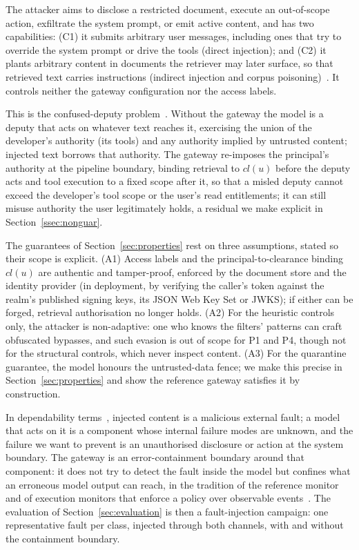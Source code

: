 \documentclass[conference]{IEEEtran}
\begin{document}
The attacker aims to disclose a restricted document, execute an out-of-scope action,
exfiltrate the system prompt, or emit active content, and has two capabilities:
(C1) it submits arbitrary user messages, including ones that try to override the
system prompt or drive the tools (direct injection); and (C2) it plants arbitrary
content in documents the retriever may later surface, so that retrieved text carries
instructions (indirect injection and corpus
poisoning)~\cite{greshake2023indirect,zou2024poisonedrag}. It controls neither the
gateway configuration nor the access labels.

This is the confused-deputy problem~\cite{hardy1988confused}. Without the gateway
the model is a deputy that acts on whatever text reaches it, exercising the union of
the developer's authority (its tools) and any authority implied by untrusted content;
injected text borrows that authority. The gateway re-imposes the principal's
authority at the pipeline boundary, binding retrieval to $\mathit{cl}(u)$ before the
deputy acts and tool execution to a fixed scope after it, so that a misled deputy cannot exceed the developer's tool scope or the user's read entitlements; it can still misuse authority the user legitimately holds, a residual we make explicit in Section~\ref{ssec:nonguar}.

The guarantees of Section~\ref{sec:properties} rest on three assumptions, stated so
their scope is explicit. (A1) Access labels and the principal-to-clearance binding
$\mathit{cl}(u)$ are authentic and tamper-proof, enforced by the document store and the identity provider (in deployment, by verifying the caller's token against the realm's published signing keys, its JSON Web Key Set or JWKS); if either can be forged, retrieval authorisation no longer holds.
(A2) For the heuristic controls only, the attacker is non-adaptive: one who knows
the filters' patterns can craft obfuscated bypasses, and such evasion is out of
scope for P1 and P4, though not for the structural controls, which never inspect
content. (A3) For the quarantine guarantee, the model honours the untrusted-data
fence; we make this precise in Section~\ref{sec:properties} and show the reference
gateway satisfies it by construction.

In dependability terms~\cite{avizienis2004taxonomy}, injected content is a
malicious external fault; a model that acts on it is a component whose internal
failure modes are unknown, and the failure we want to prevent is an unauthorised
disclosure or action at the system boundary. The gateway is an error-containment
boundary around that component: it does not try to detect the fault inside the model
but confines what an erroneous model output can reach, in the tradition of the
reference monitor~\cite{anderson1972computer} and of execution monitors that enforce
a policy over observable events~\cite{schneider2000enforceable}. The evaluation of
Section~\ref{sec:evaluation} is then a fault-injection campaign: one representative
fault per class, injected through both channels, with and without the containment
boundary.
\end{document}
